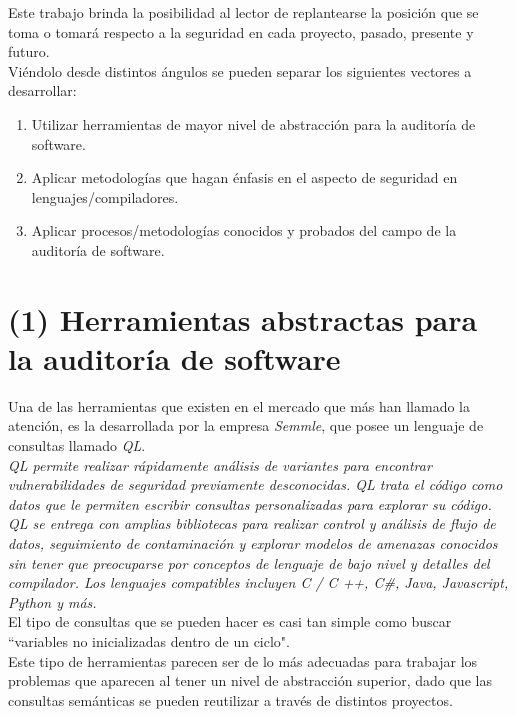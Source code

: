 Este trabajo brinda la posibilidad al lector de replantearse la posición que se toma o tomará respecto a la seguridad en cada proyecto, pasado, presente y futuro.\\

Viéndolo desde distintos ángulos se pueden separar los siguientes vectores a desarrollar:
\begin{enumerate}
    \item Utilizar herramientas de mayor nivel de abstracción para la auditoría de software.
    \item Aplicar metodologías que hagan énfasis en el aspecto de seguridad en lenguajes/compiladores.  
    \item Aplicar procesos/metodologías conocidos y probados del campo de la auditoría de software.
\end{enumerate}

\section{(1) Herramientas abstractas para la auditoría de software}

Una de las herramientas que existen en el mercado que más han llamado la atención, es la desarrollada por la empresa \textit{Semmle}, que posee un lenguaje de consultas llamado \textit{QL}.\\


\textit{QL permite realizar rápidamente análisis de variantes para encontrar vulnerabilidades de seguridad previamente desconocidas. QL trata el código como datos que le permiten escribir consultas personalizadas para explorar su código.}\\

\textit{QL se entrega con amplias bibliotecas para realizar control y análisis de flujo de datos, seguimiento de contaminación y explorar modelos de amenazas conocidos sin tener que preocuparse por conceptos de lenguaje de bajo nivel y detalles del compilador. Los lenguajes compatibles incluyen C / C ++, C\#, Java, Javascript, Python y más.}\\

El tipo de consultas que se pueden hacer es casi tan simple como buscar ``variables no inicializadas dentro de un ciclo".\\

Este tipo de herramientas parecen ser de lo más adecuadas para trabajar los problemas que aparecen al tener un nivel de abstracción superior, dado que las consultas semánticas se pueden reutilizar a través de distintos proyectos.


